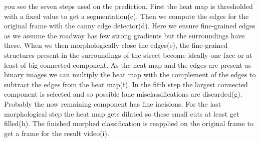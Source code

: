 you see the seven steps used on the prediction. First the heat map is thresholded with a fixed value to get a segmentation(c). Then we compute the edges for the original frame with the canny edge detector(d). Here we ensure fine-grained edges as we assume the roadway has few strong gradients but the surroundings have these. When we then morphologically close the edges(e), the fine-grained structures present in the surroundings of the street become ideally one face or at least of big connected component. As the heat map and the edges are present as binary images we can multiply the heat map with the complement of the edges to subtract the edges from the heat map(f). In the fifth step the largest connected component is selected and so possible lone misclassifications are discarded(g). Probably the now remaining component has fine incisions. For the last morphological step the heat map gets dilated so these small cuts at least get filled(h). The finished morphed classification is reapplied on the original frame to get a frame for the result video(i).
